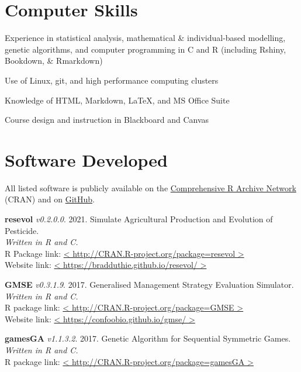 \documentclass[letterpaper]{article}
\renewenvironment{itemize}{
  \begin{list}{}{
    \setlength{\leftmargin}{1.5em}
  }
}{
  \end{list}
}
\begin{document}
\section*{Computer Skills}
\begin{itemize}
\item Experience in statistical analysis, mathematical \& individual-based modelling, genetic algorithms, and computer programming in C and R (including Rshiny, Bookdown, \& Rmarkdown) %
\item Use of Linux, git, and high performance computing clusters
\item Knowledge of HTML, Markdown, \LaTeX, and MS Office Suite
\item Course design and instruction in Blackboard and Canvas
\end{itemize}

\section*{Software Developed}

All listed software is publicly available on the \href{https://cran.r-project.org/}{Comprehensive R Archive Network} (CRAN) and on \href{https://github.com/bradduthie}{GitHub}.

\begin{etaremune}
\item {\bf resevol} {\it v0.2.0.0}. 2021. Simulate Agricultural Production and Evolution of Pesticide. \\
{\it Written in R and C.} \\
R Package link:  \href{http://CRAN.R-project.org/package=resevol}{< http://CRAN.R-project.org/package=resevol >} \\
Website link: \href{https://bradduthie.github.io/resevol/}{< https://bradduthie.github.io/resevol/ >}
\item {\bf GMSE} {\it v0.3.1.9}. 2017. Generalised Management Strategy Evaluation Simulator. {\it Written in R and C.} \\
R package link: \href{http://CRAN.R-project.org/package=GMSE}{< http://CRAN.R-project.org/package=GMSE >} \\
Website link: \href{https://confoobio.github.io/gmse/}{< https://confoobio.github.io/gmse/ >}
\item {\bf gamesGA} {\it v1.1.3.2}. 2017. Genetic Algorithm for Sequential Symmetric Games. {\it Written in R and C.} \\
R package link: \href{http://CRAN.R-project.org/package=gamesGA}{< http://CRAN.R-project.org/package=gamesGA >}
\end{etaremune}
\end{document}
